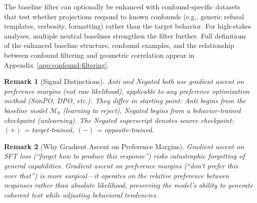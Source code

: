 \documentclass[11pt]{article}
\newtheorem{remark}{Remark}[section]
\begin{document}
The baseline filter can optionally be enhanced with confound-specific datasets that test whether projections respond to known confounds (e.g., generic refusal templates, verbosity, formatting) rather than the target behavior. For high-stakes analyses, multiple neutral baselines strengthen the filter further. Full definitions of the enhanced baseline structure, confound examples, and the relationship between confound filtering and geometric correlation appear in Appendix~\ref{app:confound-filtering}.

\begin{remark}[Signal Distinctions]
\label{rem:signal-distinctions}
Anti and Negated both use gradient ascent on preference margins (not raw likelihood), applicable to any preference optimization method (SimPO, DPO, etc.). They differ in starting point: Anti begins from the baseline model $\mathcal{M}_0$ (learning to reject), Negated begins from a behavior-trained checkpoint (unlearning). The Negated superscript denotes source checkpoint: $(+)$ = target-trained, $(-)$ = opposite-trained.
\end{remark}

\begin{remark}[Why Gradient Ascent on Preference Margins]
\label{rem:why-gradient-ascent-on-preference-margins}
Gradient ascent on SFT loss (``forget how to produce this response'') risks catastrophic forgetting of general capabilities. Gradient ascent on preference margins (``don't prefer this over that'') is more surgical---it operates on the relative preference between responses rather than absolute likelihood, preserving the model's ability to generate coherent text while adjusting behavioral tendencies.
\end{remark}
\end{document}
